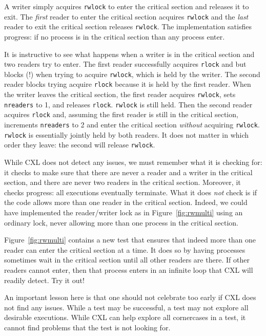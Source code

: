 \documentclass{report}
\begin{document}
A writer simply acquires \texttt{rwlock} to enter the critical section
and releases it to exit.  The \emph{first} reader to enter the critical
section acquires \texttt{rwlock} and the \emph{last} reader to exit
the critical section releases \texttt{rwlock}.
The implementation satisfies progress: if no process is in the critical
section than any process enter.

It is instructive to see what happens when a writer is in the critical
section and two readers try to enter.  The first reader successfully
acquires \texttt{rlock} and but blocks (!) when trying to acquire
\texttt{rwlock}, which is held by the writer.  The second reader blocks
trying acquire \texttt{rlock} because it is held by the first reader.
When the writer leaves the critical section, the first reader acquires
\texttt{rwlock}, sets \texttt{nreaders} to 1, and releases \texttt{rlock}.
\texttt{rwlock} is still held.
Then the second reader acquires \texttt{rlock} and, assuming the first
reader is still in the critical section, increments \texttt{nreaders} to 2
and enter the critical section \emph{without} acquiring \texttt{rwlock}.
\texttt{rwlock} is essentially jointly held by both readers.
It does not matter in which order they leave: the second will release
\texttt{rwlock}.

While CXL does not detect any issues, we must remember what it is checking
for: it checks to make sure that there are never a reader and a writer
in the critical section, and there are never two readers in the critical
section.  Moreover, it checks progress: all executions eventually terminate.
What it does \emph{not} check is if the code allows more than one reader
in the critical section.  Indeed, we could have implemented the reader/writer
lock as in Figure~\ref{fig:rwmulti} using an ordinary lock, never allowing
more than one process in the critical section.

Figure~\ref{fig:rwmulti} contains a new test that ensures that indeed more
than one reader can enter the critical section at a time.  It does so by
having processes sometimes wait in the critical section until all other readers
are there.  If other readers cannot enter, then that process enters in an
infinite loop that CXL will readily detect.  Try it out!

An important lesson here is that one should not celebrate too early if CXL
does not find any issues.  While a test may be successful, a test may not
explore all desirable executions.  While CXL can help explore all cornercases
in a test, it cannot find problems that the test is not looking for.
\end{document}
